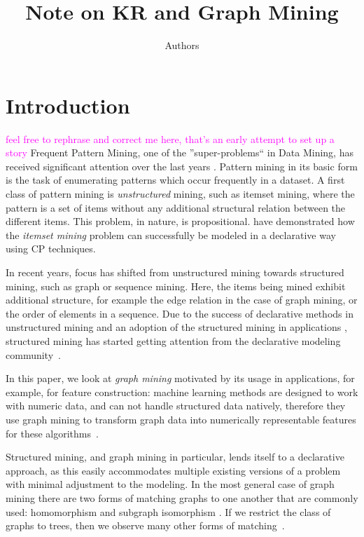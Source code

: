 \documentclass{article}
\author{Authors}
\title{Note on KR and Graph Mining}
\theoremstyle{definition}
\newcommand{\sergey}[1]{\textcolor{magenta}{\marginpar{\sc Sergey} #1}}
\begin{document}
\maketitle

\section{Introduction}
\sergey{feel free to rephrase and correct me here, that's an early attempt to set up a story} 
Frequent Pattern Mining, one of the ''super-problems`` in Data Mining, has received significant attention over the last years \citep{pattern_mining_book}. Pattern mining in its basic form is the task of enumerating patterns which occur frequently in a dataset.
A first class of pattern mining is \emph{unstructured} mining, such as itemset mining, where the pattern is a set of items without any additional structural relation between the different items.
This problem, in nature, is propositional.
\citet{tias_original} have demonstrated how the \emph{itemset mining} problem can successfully be modeled in a declarative way using CP techniques.

In recent years, focus has shifted from unstructured mining towards structured mining, such as graph or sequence mining.
Here, the items being mined exhibit additional structure, for example the edge relation in the case of graph mining, or the order of elements in a sequence.
Due to the success of declarative methods in unstructured mining \citep{tias_original,mining_cp_extra,tias_declarative_pattern_mining} and an adoption of the structured mining in applications \citep{pattern_mining_classification}, 
structured mining has started getting attention from the declarative modeling community~\citep{cp_sequence_mining,ilp_graph_mining}.

In this paper, we look at \emph{graph mining} motivated by its usage in applications, for example, for feature construction:
machine learning methods are designed to work with numeric data, and can not handle structured data natively, therefore they use graph mining to transform graph data into numerically representable features for these algorithms~\citep{pattern_mining_classification}.

Structured mining, and graph mining in particular, lends itself to a declarative approach, as this easily accommodates multiple existing versions of a problem with minimal adjustment to the modeling.
In the most general case of graph mining there are two forms of matching graphs to one another that are commonly used: homomorphism \citep{theta_subsumption} and subgraph isomorphism \citep{gspan}.
If we restrict the class of graphs to trees, then we observe many other forms of matching~\citep{subtree_overview}.
\end{document}
